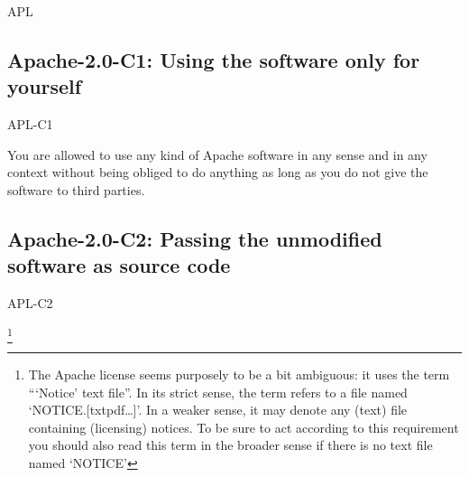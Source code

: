 \begin{license}{APL}

\subsection{Apache-2.0-C1: Using the software only for yourself}
\begin{lsuc}{APL-C1}



  \begin{lsucrequiresnothing}
    \item You are allowed to use any kind of Apache software in any sense and in
      any context without being obliged to do anything as long as you do not
      give the software to third parties. 
  \end{lsucrequiresnothing}
  
  \begin{lsucprohibits}
    \lsucitem{\noTrademarks}
    \lsucitem{\noPatentLitigation}
  \end{lsucprohibits}
\end{lsuc}

\subsection{Apache-2.0-C2: Passing the unmodified software as source code}
\begin{lsuc}{APL-C2}



  \begin{lsucrequires}
    \lsucmandatory{\copyLicenseWithSource}\passingFilesCorrectly
    \lsucmandatory{\keepLicenseElements}
    \lsucmandatory{\keepNoticeFile}%
    \footnote{The Apache license seems purposely to be a bit ambiguous: it
      uses the term \enquote{\enquote{Notice} text file}. In its strict sense,
      the term refers to a file named
      `NOTICE.[txt\textbar{}pdf\textbar{}\ldots]'. In a weaker sense, it may 
      denote any (text) file containing (licensing) notices. To be sure to act
      according to this requirement you should also read this term in the
      broader sense if there is no text file named `NOTICE'}
      

\end{lsucrequires}
\end{lsuc}
\end{license}

